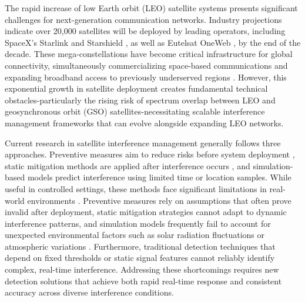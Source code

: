 \documentclass[conference]{IEEEtran}
\begin{document}
The rapid increase of low Earth orbit (LEO) satellite systems presents significant challenges for next-generation communication networks. Industry projections indicate over 20,000 satellites will be deployed by leading operators, including SpaceX's Starlink \cite{starlink} and Starshield \cite{spacex_starshield}, as well as Eutelsat OneWeb \cite{oneweb}, by the end of the decade. These mega-constellations have become critical infrastructure for global connectivity, simultaneously commercializing space-based communications and expanding broadband access to previously underserved regions \cite{reddyLowEarthOrbit2023}. However, this exponential growth in satellite deployment creates fundamental technical obstacles-particularly the rising risk of spectrum overlap between LEO and geosynchronous orbit (GSO) satellites-necessitating scalable interference management frameworks that can evolve alongside expanding LEO networks.

Current research in satellite interference management generally follows three approaches. Preventive measures aim to reduce risks before system deployment \cite{sharmaInlineInterferenceMitigation2016, liOptimalBeamPower2019}, static mitigation methods are applied after interference occurs \cite{wangCoFrequencyInterferenceAnalysis2020, zhangSpectralCoexistenceLEO2018}, and simulation-based models predict interference using limited time or location samples. While useful in controlled settings, these methods face significant limitations in real-world environments \cite{yunDynamicDownlinkInterference2023}. Preventive measures rely on assumptions that often prove invalid after deployment, static mitigation strategies cannot adapt to dynamic interference patterns, and simulation models frequently fail to account for unexpected environmental factors such as solar radiation fluctuations or atmospheric variations \cite{facskoSpaceWeatherEffects2023}. Furthermore, traditional detection techniques that depend on fixed thresholds or static signal features cannot reliably identify complex, real-time interference. Addressing these shortcomings requires new detection solutions that achieve both rapid real-time response and consistent accuracy across diverse interference conditions.
\end{document}
